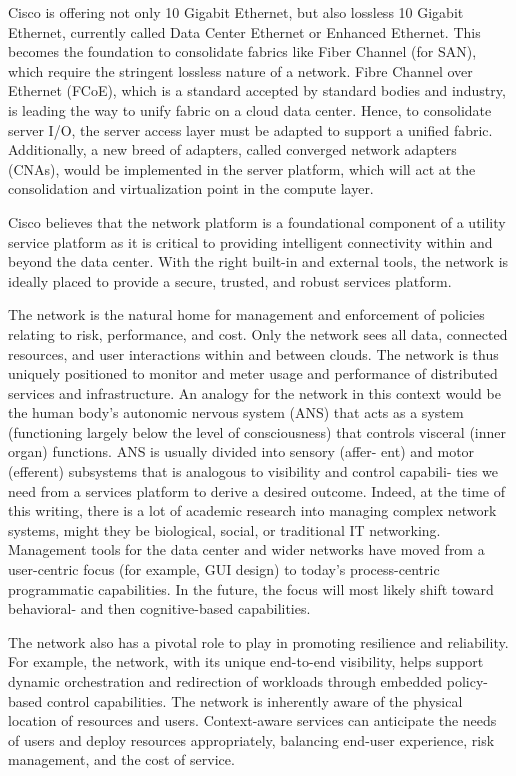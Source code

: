 Cisco is offering not only 10 Gigabit Ethernet, but also lossless 10 Gigabit Ethernet, currently called Data Center Ethernet or Enhanced Ethernet. This becomes the foundation to consolidate fabrics like Fiber Channel (for SAN), which require the stringent lossless nature of a network. Fibre Channel over Ethernet (FCoE), which is a standard accepted by standard bodies and industry, is leading the way to unify fabric on a cloud data center. Hence, to consolidate server I/O, the server access layer must be adapted to support a unified fabric. Additionally, a new breed of adapters, called converged network adapters (CNAs), would be implemented in the server platform, which will act at the consolidation and virtualization point in the compute layer.


Cisco believes that the network platform is a foundational component of a utility service platform as it is critical to providing intelligent connectivity within and beyond the data center. With the right built-in and external tools, the network is ideally placed to provide a secure, trusted, and robust services platform.

The network is the natural home for management and enforcement of policies relating to risk, performance, and cost. Only the network sees all data, connected resources, and user interactions within and between clouds. The network is thus uniquely positioned to monitor and meter usage and performance of distributed services and infrastructure. An analogy for the network in this context would be the human body’s autonomic nervous system (ANS) that acts as a system (functioning largely below the level of consciousness) that controls visceral (inner organ) functions. ANS is usually divided into sensory (affer- ent) and motor (efferent) subsystems that is analogous to visibility and control capabili- ties we need from a services platform to derive a desired outcome. Indeed, at the time of this writing, there is a lot of academic research into managing complex network systems, might they be biological, social, or traditional IT networking. Management tools for the data center and wider networks have moved from a user-centric focus (for example, GUI design) to today’s process-centric programmatic capabilities. In the future, the focus will most likely shift toward behavioral- and then cognitive-based capabilities.

The network also has a pivotal role to play in promoting resilience and reliability. For example, the network, with its unique end-to-end visibility, helps support dynamic orchestration and redirection of workloads through embedded policy-based control capabilities. The network is inherently aware of the physical location of resources and users. Context-aware services can anticipate the needs of users and deploy resources appropriately, balancing end-user experience, risk management, and the cost of service.


